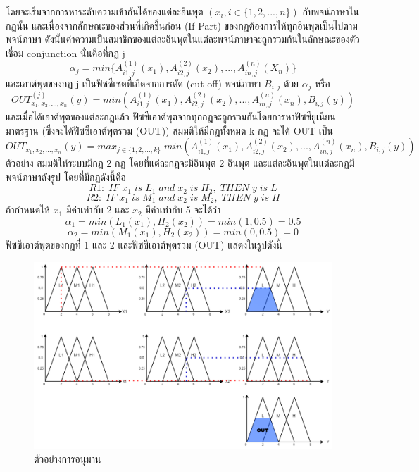 โดยจะเริ่มจากการหาระดับความเข้ากันได้ของแต่ละอินพุต \((x_{i}, i \in \{1,2,...,n\})\) กับพจน์ภาษาในกฏนั้น และเนื่องจากลักษณะของส่วนที่เกิดขึ้นก่อน (If Part) ของกฏต้องการให้ทุกอินพุตเป็นไปตามพจน์ภาษา ดังนั้นค่าความเป็นสมาชิกของแต่ละอินพุตในแต่ละพจน์ภาษาจะถูกรวมกันในลักษณะของตัวเชื่อม conjunction นั่นคือที่กฏ j
\begin{equation}
\alpha_{j} = min\{A^{(1)}_{i1,j}(x_{1}), A^{(2)}_{i2,j}(x_{2}), ..., A^{(n)}_{in,j}(X_{n})\}
\end{equation}
และเอาต์พุตของกฏ j เป็นฟัซซีเซตที่เกิดจากการตัด (cut off) พจน์ภาษา \(B_{i,j}\) ด้วย \(\alpha_{j}\) หรือ
\begin{equation}
OUT^{(j)}_{x_{1},x_{2},...,x_{n}} (y) = min(A^{(1)}_{i1,j}(x_{1}), A^{(2)}_{i2,j}(x_{2}),...,A^{(n)}_{in,j}(x_{n}),B_{i,j}(y))
\end{equation}
และเมื่อได้เอาต์พุตของแต่ละกฏแล้ว ฟัซซีเอาต์พุตจากทุกกฏจะถูกรวมกันโดยการหาฟัซซียูเนียนมาตรฐาน (ซึ่งจะได้ฟัซซีเอาต์พุตรวม (OUT)) สมมติให้มีกฏทั้งหมด k กฏ จะได้ OUT เป็น
\begin{equation}
OUT_{x_{1},x_{2},...,x_{n}} (y) = max_{j \in \{1,2,...,k\}}\; min(A^{(1)}_{i1,j}(x_{1}), A^{(2)}_{i2,j}(x_{2}),...,A^{(n)}_{in,j}(x_{n}),B_{i,j}(y))
\end{equation}
ตัวอย่าง สมมติให้ระบบมีกฏ 2 กฏ โดยที่แต่ละกฏจะมีอินพุต 2 อินพุต และแต่ละอินพุตในแต่ละกฏมีพจน์ภาษาดังรูป โดยที่มีกฏดังนี้คือ
\[R1:\; IF\; x_{1}\; is\; L_{1}\; and\; x_{2}\; is\; H_{2},\; THEN\; y\; is\; L \]
\[R2:\; IF\; x_{1}\; is\; M_{1}\; and\; x_{2}\; is\; M_{2},\; THEN\; y\; is\; H \]
ถ้ากำหนดให้ \(x_{1}\) มีค่าเท่ากับ 2 และ \(x_{2}\) มีค่าเท่ากับ 5 จะได้ว่า
\[\alpha_{1} = min(L_{1}(x_{1}),H_{2}(x_{2})) = min (1,0.5) = 0.5\]
\[\alpha_{2} = min(M_{1}(x_{1}),H_{2}(x_{2})) = min (0,0.5) = 0\]ฟัซซีเอาต์พุตของกฏที่ 1 และ 2 และฟัซซีเอาต์พุตรวม (OUT) แสดงในรูปดังนี้
\begin{figure}[ht]
    \centering
    \includegraphics[scale=0.3]{images/ex_inference.png}
    \caption{ตัวอย่างการอนุมาน}
    \label{fig:7}
\end{figure}

